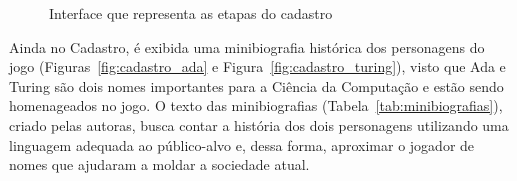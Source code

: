 
\begin{figure}[H]
\centering
{}
\quad %
\quad %
\quad %
\caption{Interface que representa as etapas do cadastro}
\label{fig:cadastro}
\end{figure}


Ainda no Cadastro, é exibida uma minibiografia histórica dos personagens do jogo (Figuras~\ref{fig:cadastro_ada} e Figura~\ref{fig:cadastro_turing}), visto que Ada e Turing são dois nomes importantes para a Ciência da Computação e estão sendo homenageados no jogo. O texto das minibiografias (Tabela~\ref{tab:minibiografias}), criado pelas autoras, busca contar a história dos dois personagens utilizando uma linguagem adequada ao público-alvo e, dessa forma, aproximar o jogador de nomes que ajudaram a moldar a sociedade atual.

